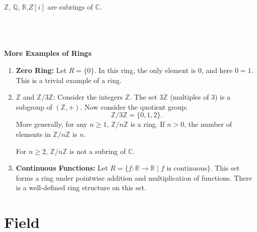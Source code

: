 \documentclass{article}
\begin{document}
$\mathbb{Z}$, $\mathbb{Q}$, $\mathbb{R}$,$Z[i]$ are subrings of $\mathbb{C}$.\\\\



\\\\

\textbf{More Examples of Rings}
\begin{enumerate}
    \item \textbf{Zero Ring:} Let $R = \{0\}$. In this ring, the only element is $0$, and here $0 = 1$. This is a trivial example of a ring.

    \item \(\mathbb{Z}\) and \(\mathbb{Z}/3\mathbb{Z}\): Consider the integers \(\mathbb{Z}\). The set \(3\mathbb{Z}\) (multiples of 3) is a subgroup of \((\mathbb{Z}, +)\). Now consider the quotient group:
    \[
    \mathbb{Z}/3\mathbb{Z} = \{0, 1, 2\}.
    \]
    More generally, for any \(n \geq 1\), \(\mathbb{Z}/n\mathbb{Z}\) is a ring. If \(n > 0\), the number of elements in \(\mathbb{Z}/n\mathbb{Z}\) is \(n\).
    
    \begin{rmk}
        For \(n \geq 2\), \(\mathbb{Z}/n\mathbb{Z}\) is not a subring of \(\mathbb{C}\).
    \end{rmk}

    \item \textbf{Continuous Functions:} Let \(R = \{f: \mathbb{R} \to \mathbb{R} \mid f \text{ is continuous}\}\). This set forms a ring under pointwise addition and multiplication of functions. There is a well-defined ring structure on this set.
\end{enumerate}


\section{Field}
\end{document}

